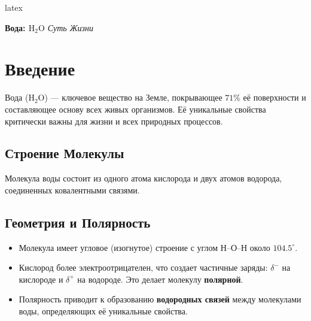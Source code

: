 \documentclass{article}
\begin{document}
\begin{preview}
latex \end{preview}\newpage\begin{preview} \begin{center}
    \vspace*{1cm}
    {\Huge \bfseries Вода: $\text{H}_2\text{O}$}
    \vspace*{0.5cm}
    {\Large \itshape Суть Жизни}
\end{center}

\vspace{1cm}

\section{Введение}
Вода ($\text{H}_2\text{O}$) — ключевое вещество на Земле, покрывающее $71\%$ её поверхности и составляющее основу всех живых организмов. Её уникальные свойства критически важны для жизни и всех природных процессов.

\end{preview}\newpage\begin{preview}

\section{Строение Молекулы}
Молекула воды состоит из одного атома кислорода и двух атомов водорода, соединенных ковалентными связями.

\subsection{Геометрия и Полярность}
\begin{itemize}
    \item Молекула имеет угловое (изогнутое) строение с углом Н--О--Н около $104.5^\circ$.
    \item Кислород более электроотрицателен, что создает частичные заряды: $\delta^-$ на кислороде и $\delta^+$ на водороде. Это делает молекулу \textbf{полярной}.
    \item Полярность приводит к образованию \textbf{водородных связей} между молекулами воды, определяющих её уникальные свойства.
\end{itemize}


\end{preview}
\end{document}

